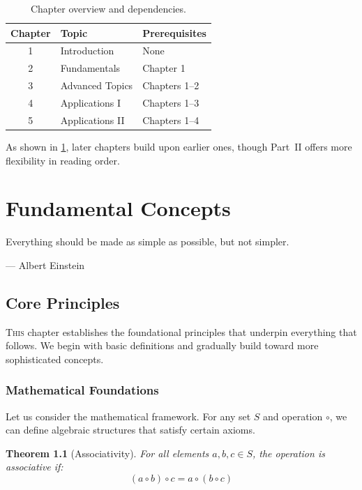 \documentclass[11pt,twoside,openright]{book}
\theoremstyle{plain}
\newtheorem{theorem}{Theorem}[chapter]
\theoremstyle{definition}
\theoremstyle{remark}
\begin{document}
\begin{table}[tbp]
    \centering
    \caption{Chapter overview and dependencies.}
    \label{tab:chapter-overview}
    \begin{tabular}{@{}clp{6cm}@{}}
        \toprule
        \textbf{Chapter} & \textbf{Topic} & \textbf{Prerequisites} \\
        \midrule
        1 & Introduction & None \\
        2 & Fundamentals & Chapter 1 \\
        3 & Advanced Topics & Chapters 1--2 \\
        4 & Applications I & Chapters 1--3 \\
        5 & Applications II & Chapters 1--4 \\
        \bottomrule
    \end{tabular}
\end{table}

As shown in \cref{tab:chapter-overview}, later chapters build upon earlier ones, though Part~II offers more flexibility in reading order.

\chapter{Fundamental Concepts}
\label{ch:fundamentals}

\epigraph{Everything should be made as simple as possible, but not simpler.}{--- Albert Einstein}

\section{Core Principles}
\label{sec:fund-principles}

\lettrine{T}{his} chapter establishes the foundational principles that underpin everything that follows. We begin with basic definitions and gradually build toward more sophisticated concepts.

\subsection{Mathematical Foundations}

Let us consider the mathematical framework. For any set $S$ and operation $\circ$, we can define algebraic structures that satisfy certain axioms.

\begin{theorem}[Associativity]
\label{thm:associativity}
For all elements $a, b, c \in S$, the operation is associative if:
\begin{equation}
    \label{eq:associativity}
    (a \circ b) \circ c = a \circ (b \circ c)
\end{equation}
\end{theorem}
\end{document}
